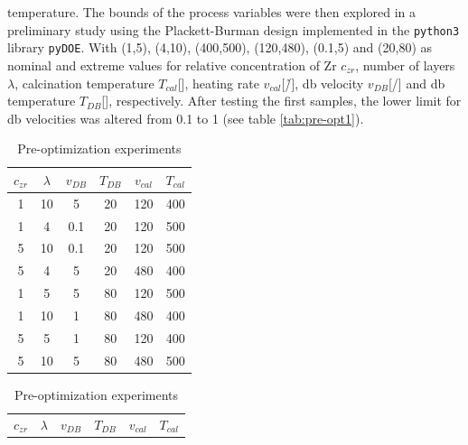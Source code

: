 temperature. The bounds of the process variables were then explored in a preliminary study 
using the Plackett-Burman\cite{Plackett1946} design implemented in the \texttt{python3} 
library \texttt{pyDOE}. With 
(1,5), (4,10), (400,500), (120,480), (0.1,5) and  (20,80) 
as nominal and extreme values for 
relative concentration of Zr $c_{zr}$, number of layers $\lambda$, calcination temperature $T_{cal}$[\oc{}], heating rate $v_{cal}$[\oc{}/\h{}], \gls{db} velocity $v_{DB}$[\mm{}/\s{}] and \gls{db} temperature $T_{DB}$[\oc{}], respectively. 
After testing the first samples, the lower limit for \gls{db} velocities was altered from 0.1 to 1 (see table \ref{tab:pre-opt1}).
\begin{table}[hbt]
	\centering
	\caption{Pre-optimization experiments}
	\label{tab:pre-opt}
	\begin{subtable}{0.5\linewidth}
		\centering
		\label{tab:pre-opt1}
		\begin{tabular}{cccccc}
			\hline
			\hline
			$c_{zr}$	&$\lambda$	&$v_{DB}$	&$T_{DB}$	&$v_{cal}$	&$T_{cal}$		\\
			\hline
	1	&10	&5	&20	&120	&400	\\
	1	&4	&0.1	&20	&120	&500	\\
	5	&10	&0.1	&20	&120	&500	\\
	5	&4	&5	&20	&480	&400	\\
	1	&5	&5	&80	&120	&500	\\
	1	&10	&1	&80	&480	&400	\\
	5	&5	&1	&80	&120	&400	\\
	5	&10	&5	&80	&480	&500	\\
			\hline\hline
		\end{tabular}
	\end{subtable}%
	\begin{subtable}{0.5\linewidth}
		\centering
		\label{tab:pre-opt2}
		\begin{tabular}{cccccc}
			\hline\hline
			$c_{zr}$	&$\lambda$	&$v_{DB}$	&$T_{DB}$	&$v_{cal}$	&$T_{cal}$		\\

\end{tabular}
\end{subtable}
\end{table}
